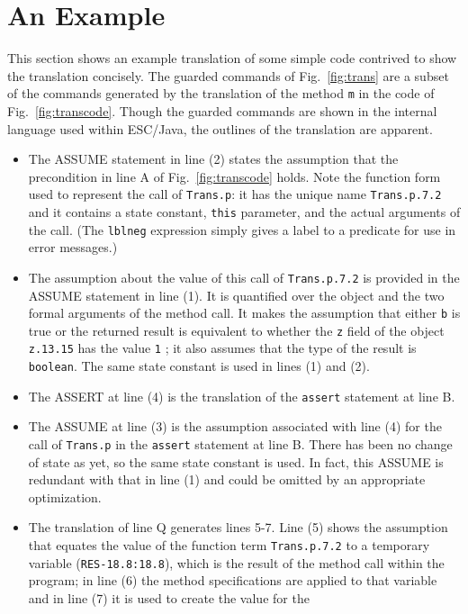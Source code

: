 \documentclass{sig-alternate2}
\begin{document}
\section{An Example}
This section shows an example translation of some simple code contrived to show the translation concisely.
The guarded commands of Fig.~\ref{fig:trans} are a subset of the 
commands generated by the translation of the method \texttt{m} in the
 code of Fig.~\ref{fig:transcode}.  Though the guarded commands are shown in
the internal language used within ESC/Java, the outlines of the translation are apparent.
\begin{itemize}
\item The ASSUME statement in line (2) states the assumption that the precondition in line A of Fig.~\ref{fig:transcode} holds.  Note the function form used to represent the call of \texttt{Trans.p}: it has the unique name 
\texttt{Trans.p.7.2} and it contains a state constant, 
\texttt{this} parameter, and the actual arguments of the call.  (The \texttt{lblneg} expression simply gives a label to a predicate for use in error messages.)
\item The assumption about the value of this call of \texttt{Trans.p.7.2} is provided in the
ASSUME statement in line (1).  It is quantified over the object and the two formal arguments of the method 
call.  It makes the assumption that either \texttt{b} is true or the returned result is equivalent to whether the \texttt{z} field of the object \texttt{z.13.15} has the value 
\texttt{1} ; it also assumes that the type of the result is \texttt{boolean}.  The same state constant is used
in lines (1) and (2).
\item The ASSERT at line (4) is the translation of the \texttt{assert} statement at line B.  
\item The ASSUME at line (3) is the assumption associated with line (4) for the call of \texttt{Trans.p} in the
\texttt{assert} statement at line B.  There has been no change of state as yet, so the same state
constant is used.  In fact, this ASSUME is redundant with that in line (1) and could be omitted by
an appropriate optimization.
\item The translation of line Q generates lines 5-7.  Line (5) shows the assumption that equates the value of the function term  \texttt{Trans.p.7.2} to a temporary variable (\texttt{RES-18.8:18.8}),
which is the result of the method call within the program; in line (6) the method specifications are applied to that variable and in line (7) it is used to create the value for the

\end{itemize}
\end{document}

